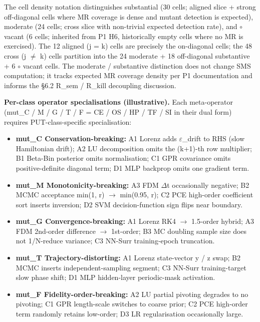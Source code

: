 \documentclass[review,12pt,authoryear]{elsarticle}
\providecommand{\tightlist}{\setlength{\itemsep}{0pt}\setlength{\parskip}{0pt}}
\begin{document}
The cell density notation distinguishes \textbullet\textbullet substantial (30 cells;
aligned slice + strong off-diagonal cells where MR coverage is dense and
mutant detection is expected), \textbullet moderate (24 cells; cross slice with
non-trivial expected detection rate), and $\circ$ vacant (6 cells; inherited
from P1 H6, historically empty cells where no MR is exercised). The 12
aligned (j = k) cells are precisely the on-diagonal cells; the 48 cross
(j $\neq$ k) cells partition into the 24 \textbullet moderate + 18 \textbullet\textbullet off-diagonal
substantive + 6 $\circ$ vacant cells. The \textbullet moderate / \textbullet\textbullet substantive
distinction does not change SMS computation; it tracks expected MR
coverage density per P1 documentation and informs the §6.2 R\_sem /
R\_kill decoupling discussion.

\textbf{Per-class operator specialisations (illustrative).} Each
meta-operator (mut\_C / M / G / T / F = CE / OS / HP / TF / SI in their
dual form) requires PUT-class-specific specialisation:

\begin{itemize}
\tightlist
\item
  \textbf{mut\_C Conservation-breaking:} A1 Lorenz adds $\varepsilon$\_drift to RHS
  (slow Hamiltonian drift); A2 LU decomposition omits the (k+1)-th row
  multiplier; B1 Beta-Bin posterior omits normalisation; C1 GPR
  covariance omits positive-definite diagonal term; D1 MLP backprop
  omits one gradient term.
\item
  \textbf{mut\_M Monotonicity-breaking:} A3 FDM $\Delta$t occasionally
  negative; B2 MCMC acceptance min(1, r) $\to$ min(0.95, r); C2 PCE
  high-order coefficient sort inserts inversion; D2 SVM
  decision-function sign flips near boundary.
\item
  \textbf{mut\_G Convergence-breaking:} A1 Lorenz RK4 $\to$ 1.5-order
  hybrid; A3 FDM 2nd-order difference $\to$ 1st-order; B3 MC doubling sample
  size does not 1/N-reduce variance; C3 NN-Surr training-epoch
  truncation.
\item
  \textbf{mut\_T Trajectory-distorting:} A1 Lorenz state-vector y / z
  swap; B2 MCMC inserts independent-sampling segment; C3 NN-Surr
  training-target slow phase shift; D1 MLP hidden-layer periodic-mask
  activation.
\item
  \textbf{mut\_F Fidelity-order-breaking:} A2 LU partial pivoting
  degrades to no pivoting; C1 GPR length-scale switches to coarse prior;
  C2 PCE high-order term randomly retains low-order; D3 LR
  regularisation occasionally large.
\end{itemize}
\end{document}
